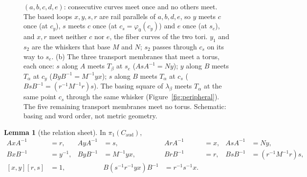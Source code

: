 \documentclass[11pt]{article}
\newcommand{\pione}{\pi_1}
\theoremstyle{definition}
\newtheorem{lemma}[theorem]{Lemma}
\begin{document}
\begin{figure}[!htbp]
{$(a,b,c,d,e)$: consecutive curves meet once and no others meet.  The based
loops $x,y,s,r$ are rail parallels of $a,b,d,e$, so $y$ meets $c$ once (at
$c_y$), $s$ meets $c$ once (at $c_s=\varphi_0(c_y)$) and $e$ once (at
$s_e$), and $x,r$ meet neither $c$ nor $e$, the fiber curves of the two
tori.  $y_1$ and $s_2$ are the whiskers that base $M$ and $N$; $s_2$ passes
through $c_s$ on its way to $s_e$.  (b) The three transport membranes that
meet a torus, each once: $s$ along $A$ meets $T_\beta$ at $s_e$
($AsA^{-1}=Ny$); $y$ along $B$ meets $T_\alpha$ at $c_y$
($ByB^{-1}=M^{-1}yx$); $s$ along $B$ meets $T_\alpha$ at $c_s$
($BsB^{-1}=(r^{-1}M^{-1}r)s$).  The basing square of $\lambda_\beta$ meets
$T_\alpha$ at the same point $c_s$ through the same whisker
(Figure~\ref{fig:peripheral}).  The five remaining transport membranes meet
no torus.  Schematic: basing and word order, not metric geometry.}
\label{fig:crossings}
\end{figure}

\begin{lemma}[the relation sheet]\label{lem:sheet}
In $\pione(C_{\mathrm{aud}})$,
\begin{align*}
AxA^{-1}&=r, & AyA^{-1}&=s, & ArA^{-1}&=x,
& AsA^{-1}&=Ny,\\
BxB^{-1}&=y^{-1}, & ByB^{-1}&=M^{-1}yx,
& BrB^{-1}&=r, & BsB^{-1}&=(r^{-1}M^{-1}r)s,\\
[x,y][r,s]&=1, &&
B(s^{-1}r^{-1}yx)B^{-1}&=r^{-1}s^{-1}x.
\end{align*}
\end{lemma}
\end{document}
